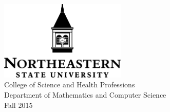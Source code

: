 \documentclass{article}
\begin{document}
\begin{center}
\includegraphics[width=6cm]{ca/tex/syllabus/nsulogo} \\ \vspace{0.5cm}
College of Science and Health Professions \\
Department of Mathematics and Computer Science \\
Fall 2015
\end{center}
\end{document}
